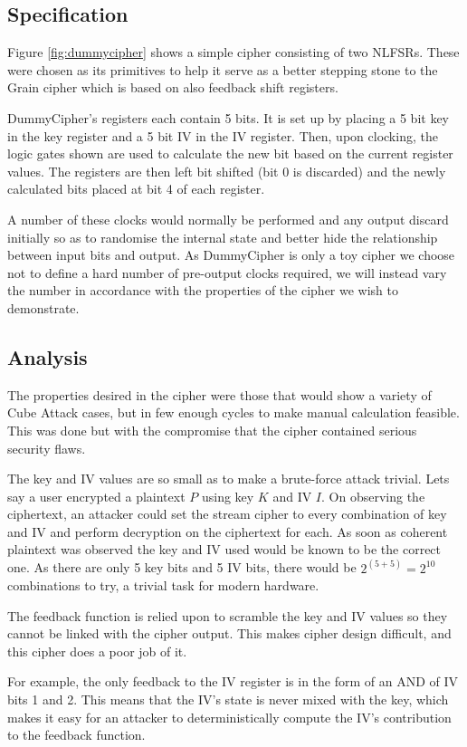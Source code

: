 \documentclass{report}
\let\Oldsubsection\subsection
\renewcommand{\subsection}{\FloatBarrier\Oldsubsection}
\begin{document}
\subsection{Specification}
Figure \ref{fig:dummycipher} shows a simple cipher consisting of two NLFSRs. These were chosen as its primitives to help it serve as a better stepping stone to the Grain cipher which is based on also feedback shift registers.

DummyCipher's registers each contain 5 bits. It is set up by placing a 5 bit key in the key register and a 5 bit IV in the IV register. Then, upon clocking, the logic gates shown are used to calculate the new bit based on the current register values. The registers are then left bit shifted (bit 0 is discarded) and the newly calculated bits placed at bit 4 of each register.

A number of these clocks would normally be performed and any output discard initially so as to randomise the internal state and better hide the relationship between input bits and output. As DummyCipher is only a toy cipher we choose not to define a hard number of pre-output clocks required, we will instead vary the number in accordance with the properties of the cipher we wish to demonstrate.

\subsection{Analysis}
The properties desired in the cipher were those that would show a variety of Cube Attack cases, but in few enough cycles to make manual calculation feasible. This was done but with the compromise that the cipher contained serious security flaws.

The key and IV values are so small as to make a brute-force attack trivial. Lets say a user encrypted a plaintext $P$ using key $K$ and IV $I$. On observing the ciphertext, an attacker could set the stream cipher to every combination of key and IV and perform decryption on the ciphertext for each. As soon as coherent plaintext was observed the key and IV used would be known to be the correct one. As there are only 5 key bits and 5 IV bits, there would be $2^{(5+5)} = 2^{10}$ combinations to try, a trivial task for modern hardware.

The feedback function is relied upon to scramble the key and IV values so they cannot be linked with the cipher output. This makes cipher design difficult, and this cipher does a poor job of it.

For example, the only feedback to the IV register is in the form of an AND of IV bits 1 and 2. This means that the IV's state is never mixed with the key, which makes it easy for an attacker to deterministically compute the IV's contribution to the feedback function.
\end{document}
